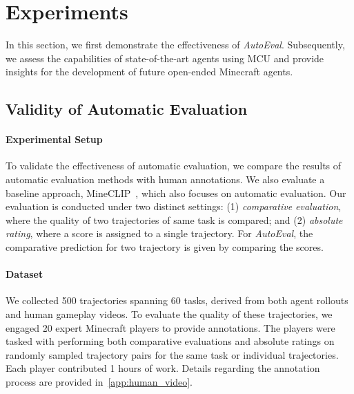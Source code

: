 
\section{Experiments}

In this section, we first demonstrate the effectiveness of \emph{AutoEval}. Subsequently, we assess the capabilities of state-of-the-art agents using MCU and provide insights for the development of future open-ended Minecraft agents.

\subsection{Validity of Automatic Evaluation}

\paragraph{Experimental Setup} 
To validate the effectiveness of automatic evaluation, we compare the results of automatic evaluation methods with human annotations. We also evaluate a baseline approach, MineCLIP~\citep{minedojo}, which also focuses on automatic evaluation. Our evaluation is conducted under two distinct settings: (1) \textit{comparative evaluation}, where the quality of two trajectories of same task is compared; and (2) \textit{absolute rating}, where a score is assigned to a single trajectory. For \emph{AutoEval}, the comparative prediction for two trajectory is given by comparing the scores.

\paragraph{Dataset} We collected 500 trajectories spanning 60 tasks, derived from both agent rollouts and human gameplay videos. To evaluate the quality of these trajectories, we engaged 20 expert Minecraft players to provide annotations. The players were tasked with performing both comparative evaluations and absolute ratings on randomly sampled trajectory pairs for the same task or individual trajectories. Each player contributed 1 hours of work. Details regarding the annotation process are provided in~\cref{app:human_video}.


